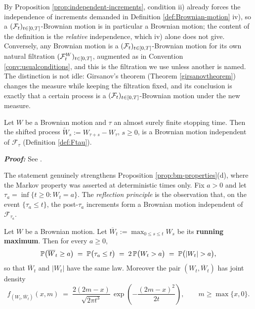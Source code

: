 By Proposition \ref{prop:independent-increments}, condition ii) already forces the independence of 
increments demanded in Definition \ref{def:Brownian-motion} iv), so a $(\mathcal{F}_t)_{t\in[0,T]}$-Brownian motion is in 
particular a Brownian motion; the content of the definition is the \emph{relative} independence, 
which iv) alone does not give. Conversely, any Brownian motion is a $(\mathcal{F}_t)_{t\in[0,T]}$-Brownian motion for its 
own natural filtration $(\mathcal{F}^{W}_t)_{t\in[0,T]}$, augmented as in Convention \ref{conv:usualconditions}, and this is 
the filtration we use unless another is named.
The distinction is not idle: Girsanov's theorem (Theorem \ref{girsanovtheorem}) changes the measure 
while keeping the filtration fixed, and its conclusion is exactly that a certain process is a 
$(\mathcal{F}_t)_{t\in[0,T]}$-Brownian motion under the new measure.



\begin{theorem}\label{thm:strongmarkov}
Let $W$ be a Brownian motion and $\tau$ an almost surely finite stopping time. Then the shifted
process $\widetilde{W}_s := W_{\tau+s} - W_\tau$, $s \geq 0$, is a Brownian motion independent of
$\mathcal{F}_\tau$ (Definition \ref{def:Ftau}). 
\end{theorem}

\textbf{\textit{Proof:}} See \cite[Thm.\ 2.6.16]{karatzasshreve1991}. \qedfilledtext

The statement genuinely strengthens Proposition \ref{prop:bm-properties}(d), where the Markov
property was asserted at deterministic times only. Fix $a>0$ and let $\tau_a = \inf\{t \geq 0 : W_t = a\}$. The \emph{reflection principle} is the
observation that, on the event $\{\tau_a \leq t\}$, the post-$\tau_a$ increments form a Brownian
motion independent of $\mathcal{F}_{\tau_a}$.

\begin{theorem}\label{thm:reflection}
Let $W$ be a Brownian motion. Let $\overline{W}_t := \max_{0\leq s\leq t} W_s$ be its
\textbf{running maximum}. Then for every $a \geq 0$,
\begin{equation}\label{eq:reflection}
\mathbb{P}\bigl( \overline{W}_t \geq a \bigr) \;=\; \mathbb{P}\bigl(\tau_a \leq t\bigr) \;=\; 2\,\mathbb{P}\bigl(W_t > a\bigr) \;=\; \mathbb{P}\bigl(|W_t| > a\bigr),
\end{equation}
so that $\overline{W}_t$ and $|W_t|$ have the same law. Moreover the pair $(W_t, \overline{W}_t)$ has joint density
\begin{equation}\label{eq:jointmaxdensity}
f_{(W_t,\overline{W}_t)}(x,m) \;=\; \frac{2(2m-x)}{\sqrt{2\pi t^{3}}}\,\exp\left(-\frac{(2m-x)^2}{2t}\right),
\qquad m \geq \max\{x,0\} .
\end{equation}
\end{theorem}

